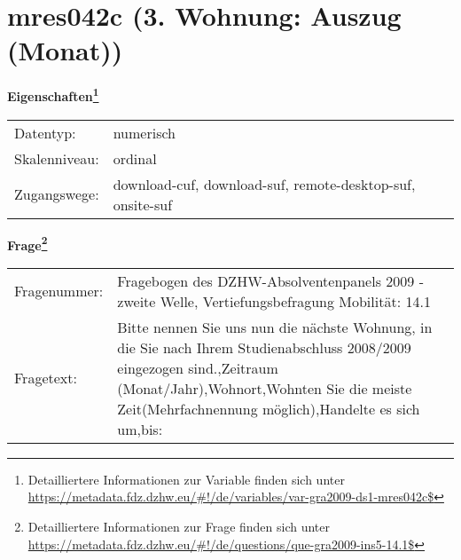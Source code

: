 
    \setcounter{footnote}{0}

    \vspace*{-1.8cm}
	\section{mres042c (3. Wohnung: Auszug (Monat))}
	\label{section:mres042c}



    \vspace*{0.5cm}
    \noindent\textbf{Eigenschaften\footnote{Detailliertere Informationen zur Variable finden sich unter
		\url{https://metadata.fdz.dzhw.eu/\#!/de/variables/var-gra2009-ds1-mres042c$}}}\\
	\begin{tabularx}{\hsize}{@{}lX}
	Datentyp: & numerisch \\
	Skalenniveau: & ordinal \\
	Zugangswege: &
	  download-cuf, 
	  download-suf, 
	  remote-desktop-suf, 
	  onsite-suf
 \\
    \end{tabularx}



				\vspace*{0.5cm}
                \noindent\textbf{Frage\footnote{Detailliertere Informationen zur Frage finden sich unter
		              \url{https://metadata.fdz.dzhw.eu/\#!/de/questions/que-gra2009-ins5-14.1$}}}\\
				\begin{tabularx}{\hsize}{@{}lX}
					Fragenummer: &
					  Fragebogen des DZHW-Absolventenpanels 2009 - zweite Welle, Vertiefungsbefragung Mobilität:
					  14.1
 \\
					Fragetext: & Bitte nennen Sie uns nun die nächste Wohnung, in die Sie nach Ihrem Studienabschluss 2008/2009 eingezogen sind.,Zeitraum (Monat/Jahr),Wohnort,Wohnten Sie die meiste Zeit(Mehrfachnennung möglich),Handelte es sich um,bis: \\
				\end{tabularx}





